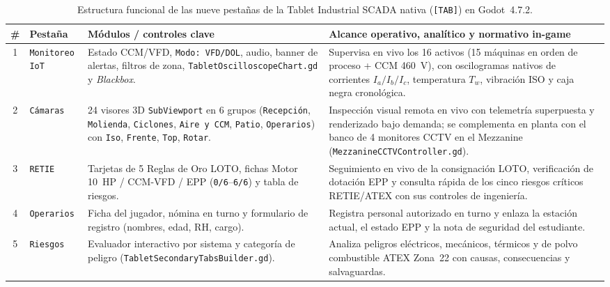 \begin{table}[!t]
\begingroup\setlength{\tabcolsep}{3.6pt}\renewcommand{\arraystretch}{1.06}
\centering\footnotesize
\caption{Estructura funcional de las nueve pestañas de la Tablet Industrial SCADA nativa (\texttt{[TAB]}) en Godot~4.7.2.}
\label{tab:tablet_pestanas}
\begin{tabularx}{\textwidth}{@{} c >{\raggedright\arraybackslash}p{2.35cm} >{\raggedright\arraybackslash}p{4.35cm} >{\raggedright\arraybackslash}X @{}}
\toprule
\textbf{\#} & \textbf{Pestaña} & \textbf{Módulos / controles clave} & \textbf{Alcance operativo, analítico y normativo in-game} \\
\midrule
1 & \texttt{Monitoreo IoT} & Estado CCM/VFD, \texttt{Modo: VFD/DOL}, audio, banner de alertas, filtros de zona, \texttt{Tablet\allowbreak Oscilloscope\allowbreak Chart.gd} y \emph{Blackbox}. & Supervisa en vivo los \num{16} activos (\num{15} máquinas en orden de proceso + CCM \qty{460}{\volt}), con oscilogramas nativos de corrientes $I_a/I_b/I_c$, temperatura $T_w$, vibración ISO y caja negra cronológica. \\
2 & \texttt{Cámaras} & \num{24} visores 3D \texttt{SubViewport} en \num{6} grupos (\texttt{Recepción}, \texttt{Molienda}, \texttt{Ciclones}, \texttt{Aire y CCM}, \texttt{Patio}, \texttt{Operarios}) con \texttt{Iso}, \texttt{Frente}, \texttt{Top}, \texttt{Rotar}. & Inspección visual remota en vivo con telemetría superpuesta y renderizado bajo demanda; se complementa en planta con el banco de \num{4} monitores CCTV en el Mezzanine (\texttt{Mezzanine\allowbreak CCTV\allowbreak Controller.gd}). \\
3 & \texttt{RETIE} & Tarjetas de 5 Reglas de Oro LOTO, fichas Motor \qty{10}{HP} / CCM-VFD / EPP (\texttt{0/6}--\texttt{6/6}) y tabla de riesgos. & Seguimiento en vivo de la consignación LOTO, verificación de dotación EPP y consulta rápida de los cinco riesgos críticos RETIE/ATEX con sus controles de ingeniería. \\
4 & \texttt{Operarios} & Ficha del jugador, nómina en turno y formulario de registro (nombres, edad, RH, cargo). & Registra personal autorizado en turno y enlaza la estación actual, el estado EPP y la nota de seguridad del estudiante. \\
5 & \texttt{Riesgos} & Evaluador interactivo por sistema y categoría de peligro (\texttt{Tablet\allowbreak Secondary\allowbreak Tabs\allowbreak Builder.gd}). & Analiza peligros eléctricos, mecánicos, térmicos y de polvo combustible ATEX Zona~22 con causas, consecuencias y salvaguardas. \\

\end{tabularx}
\end{table}
